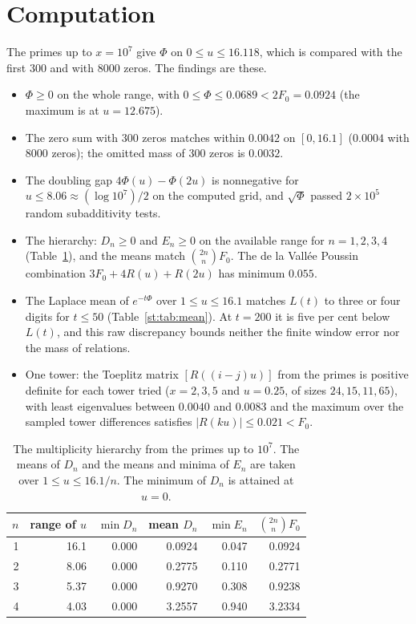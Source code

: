 \section{Computation}\label{st:sec:compute}
The primes up to $x=10^7$ give $\Phi$ on $0\le u\le16.118$, which is compared with the first 300 and with 8000 zeros. The findings are these.
\begin{itemize}
\item $\Phi\ge0$ on the whole range, with $0\le\Phi\le0.0689<2F_0=0.0924$ (the maximum is at $u=12.675$).
\item The zero sum with 300 zeros matches within $0.0042$ on $[0,16.1]$ ($0.0004$ with 8000 zeros); the omitted mass of 300 zeros is $0.0032$.
\item The doubling gap $4\Phi(u)-\Phi(2u)$ is nonnegative for $u\le8.06\approx(\log10^7)/2$ on the computed grid, and $\sqrt\Phi$ passed $2\times10^5$ random subadditivity tests.
\item The hierarchy: $D_n\ge0$ and $E_n\ge0$ on the available range for $n=1,2,3,4$ (Table~\ref{st:tab:hier}), and the means match $\binom{2n}{n}F_0$. The de la Vall\'ee Poussin combination $3F_0+4R(u)+R(2u)$ has minimum $0.055$.
\item The Laplace mean of $e^{-t\Phi}$ over $1\le u\le16.1$ matches $L(t)$ to three or four digits for $t\le50$ (Table~\ref{st:tab:mean}). At $t=200$ it is five per cent below $L(t)$, and this raw discrepancy bounds neither the finite window error nor the mass of relations.
\item One tower: the Toeplitz matrix $[R((i-j)u)]$ from the primes is positive definite for each tower tried ($x=2,3,5$ and $u=0.25$, of sizes $24,15,11,65$), with least eigenvalues between $0.0040$ and $0.0083$ and the maximum over the sampled tower differences satisfies $|R(ku)|\le0.021<F_0$.
\end{itemize}
\begin{table}[h]\centering\small
\begin{tabular}{rrrrrr}
\toprule
$n$ & range of $u$ & $\min D_n$ & mean $D_n$ & $\min E_n$ & $\binom{2n}{n}F_0$\\
\midrule
1 & 16.1 & 0.000 & 0.0924 & 0.047 & 0.0924\\
2 & 8.06 & 0.000 & 0.2775 & 0.110 & 0.2771\\
3 & 5.37 & 0.000 & 0.9270 & 0.308 & 0.9238\\
4 & 4.03 & 0.000 & 3.2557 & 0.940 & 3.2334\\
\bottomrule
\end{tabular}
\caption{The multiplicity hierarchy from the primes up to $10^7$. The means of $D_n$ and the means and minima of $E_n$ are taken over $1\le u\le16.1/n$. The minimum of $D_n$ is attained at $u=0$.}\label{st:tab:hier}
\end{table}
